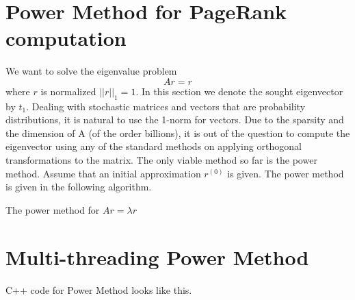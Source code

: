 \documentclass[a4paper]{article}
\begin{document}
\section{Power Method for PageRank computation}
We want to solve the eigenvalue problem
$$Ar = r$$
where $r$ is normalized 
$||r||_1 = 1$.
 In this section we denote the sought eigenvector by
$t_1$. Dealing with stochastic matrices and vectors that are probability distributions,
it is natural to use the 1-norm for vectors. Due to the sparsity and
the dimension of A (of the order billions), it is out of the question to compute the
eigenvector using any of the standard methods on applying orthogonal transformations to
the matrix. The only viable method so far is the power method.
Assume that an initial approximation $r^{(0)}$ is given. The power method is given
in the following algorithm.\\
\begin{algorithm}[H]
\SetAlgoLined

 \caption{The power method for $Ar = \lambda r$}
\end{algorithm}

\section{Multi-threading Power Method}
C++ code for Power Method looks like this.
\end{document}
